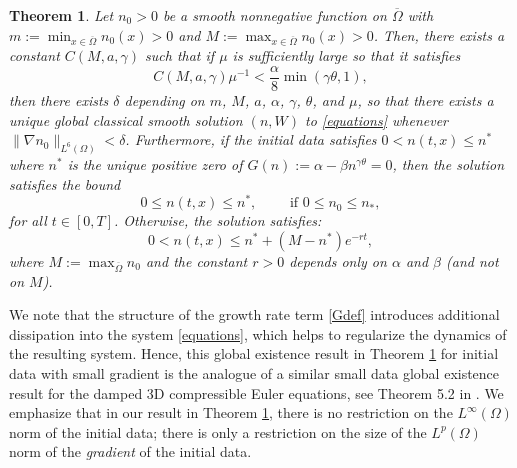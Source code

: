 \documentclass[12pt]{article}
\theoremstyle{plain}
\newtheorem{theorem}{Theorem}[section]
\begin{document}
\begin{theorem}\label{global}
Let $n_{0} > 0$ be a smooth nonnegative function on $\overline{\Omega}$ with $m := \min_{x \in \overline{\Omega}} n_{0}(x) > 0$ and $M := \max_{x \in \overline{\Omega}} n_{0}(x) > 0$. Then, there exists a constant $C(M, a, \gamma)$ such that if $\mu$ is sufficiently large so that it satisfies 
\begin{equation*}
C(M, a, \gamma)\mu^{-1} < \frac{\alpha}{8}\min(\gamma \theta, 1), 
\end{equation*}
then there exists $\delta$ depending on $m$, $M$, $a$, $\alpha$, $\gamma$, $\theta$, and $\mu$, so that there exists a unique global classical smooth solution $(n, W)$ to \eqref{equations} whenever $\|\nabla n_{0}\|_{L^{6}(\Omega)} < \delta$. Furthermore, if the initial data satisfies $0 < n(t, x) \le n^{*}$ where $n^{*}$ is the unique positive zero of $G(n) := \alpha - \beta n^{\gamma \theta} = 0$, then the solution satisfies the bound 
\begin{equation}\label{boundnstar}
0 \le n(t, x) \le n^{*}, \qquad \text{ if } 0 \le n_{0} \le n_{*},
\end{equation}
for all $t \in [0, T]$. Otherwise, the solution satisfies:
\begin{equation}\label{boundngeneral}
0 < n(t, x) \le n^{*} + (M - n^{*})e^{-rt},
\end{equation}
where $M := \max_{\overline{\Omega}} n_{0}$ and the constant $r > 0$ depends only on $\alpha$ and $\beta$ (and not on $M$).
\end{theorem}
We note that the structure of the growth rate term \eqref{Gdef} introduces additional dissipation into the system \eqref{equations}, which helps to regularize the dynamics of the resulting system. Hence, this global existence result in Theorem \ref{global} for initial data with small gradient is the analogue of a similar small data global existence result for the damped 3D compressible Euler equations, see Theorem 5.2 in \cite{Sideris}. We emphasize that in our result in Theorem \ref{global}, there is no restriction on the $L^{\infty}(\Omega)$ norm of the initial data; there is only a restriction on the size of the $L^{p}(\Omega)$ norm of the \textit{gradient} of the initial data. 
\end{document}
